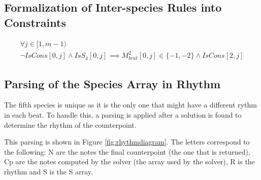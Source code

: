 \subsection*{Formalization of Inter-species Rules into Constraints}
\begin{equation} \label{eq:syncopationvariation}
    \begin{gathered}
        \forall j \in [1, m-1)\\
        \lnot IsCons[0, j] \land IsS_{4}[0, j] \implies M^{2}_{brut}[0, j] \in \{-1, -2\} \land IsCons[2, j]
    \end{gathered}
\end{equation}

\subsection*{Parsing of the Species Array in Rhythm}
The fifth species is unique as it is the only one that might have a different rythm in each beat. To handle this, a parsing is applied after a solution is found to determine the rhythm of the counterpoint.

This parsing is shown in Figure \ref{fig:rhythmdiagram}. The letters correspond to the following: N are the notes the final counterpoint (the one that is returned), Cp are the notes computed by the solver (the array used by the solver), R is the rhythm and S is the S array.

